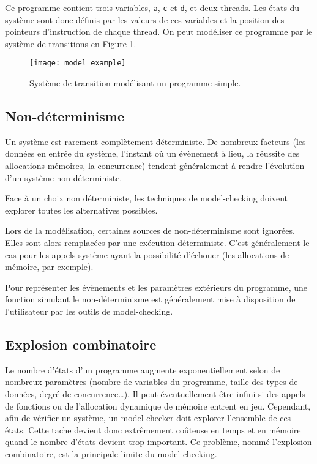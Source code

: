 Ce programme contient trois variables, \texttt{a}, \texttt{c} et
\texttt{d}, et deux threads. Les états du système sont donc définis par les
valeurs de ces variables et la position des pointeurs d'instruction de chaque
thread. On peut modéliser ce programme par le système de transitions en Figure
\ref{fig:model_example}.

\begin{figure}
\begin{center}
\texttt{[image: model\_example]}
\end{center}
\caption{Système de transition modélisant un programme simple.}
\label{fig:model_example}
\end{figure}

\subsection{Non-déterminisme}

Un système est rarement complètement déterministe. De nombreux facteurs (les
données en entrée du système, l'instant où un évènement à lieu, la réussite des
allocations mémoires, la concurrence) tendent généralement à rendre l'évolution
d'un système non déterministe.

Face à un choix non déterministe, les techniques de model-checking doivent
explorer toutes les alternatives possibles.

Lors de la modélisation, certaines sources de non-déterminisme sont ignorées.
Elles sont alors remplacées par une exécution déterministe.
C'est généralement le cas pour les appels système ayant la possibilité
d'échouer (les allocations de mémoire, par exemple).

Pour représenter les évènements et les paramètres extérieurs du programme,
une fonction simulant le non-déterminisme est généralement mise à disposition
de l'utilisateur par les outils de model-checking.

\subsection{Explosion combinatoire}

Le nombre d'états d'un programme augmente exponentiellement selon de nombreux
paramètres (nombre de variables du programme, taille des types de données, degré
de concurrence\dots). Il peut éventuellement être infini si des appels de
fonctions ou de l'allocation dynamique de mémoire entrent en jeu. Cependant, afin
de vérifier un système, un model-checker doit explorer l'ensemble de ces états.
Cette tache devient donc extrêmement coûteuse en temps et en mémoire quand le
nombre d'états devient trop important.
Ce problème, nommé l'explosion combinatoire, est la principale limite du
model-checking.


